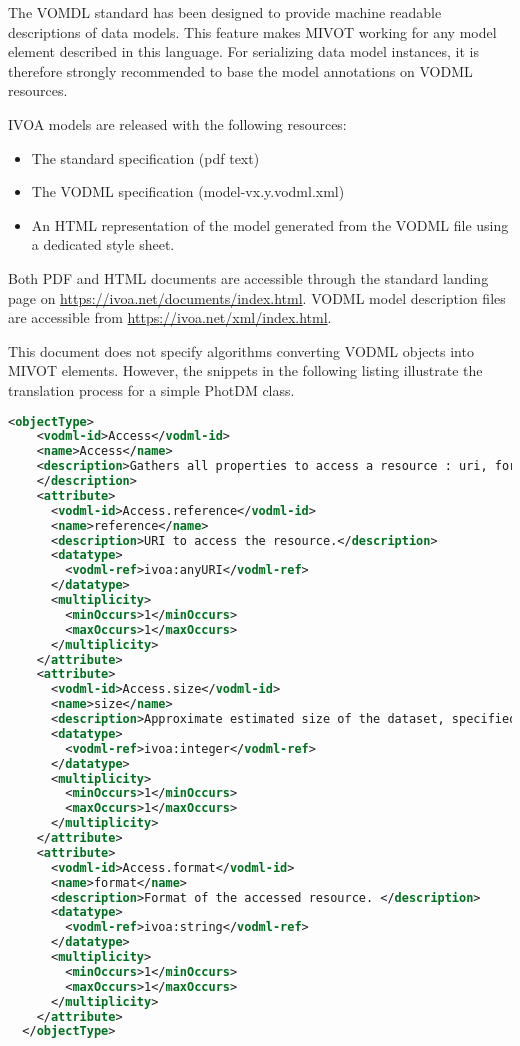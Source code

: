 The VOMDL standard has been designed to provide machine readable descriptions of data models. 
This feature makes MIVOT working for any model element described in this language. 
For serializing data model instances, it is therefore strongly recommended to base 
the model annotations on VODML resources.

IVOA models are released with the following resources:
\begin{itemize}
    \item The standard specification (pdf text)
    \item The VODML specification (model-vx.y.vodml.xml)
    \item An HTML representation of the model generated from the VODML file using a dedicated style sheet.    
\end{itemize}

Both PDF and HTML documents are accessible through the standard landing page
on \url{https://ivoa.net/documents/index.html}.
VODML model description files are accessible from \url{https://ivoa.net/xml/index.html}.

This document does not specify algorithms converting VODML objects 
into MIVOT elements. However, the snippets in the following listing illustrate the translation process for a simple PhotDM class.

\begin{lstlisting}[caption={VODML representation of the PhotDM class \texttt{Access}.
This is an object type with 3 attributes, each one with a cardinality equal  to 1. 
At this stage, we do not know whether attributes are typed complex or primitive type. 
This will be completed later on by going through their own VODML definitions.},language=XML]
  <objectType>
    <vodml-id>Access</vodml-id>
    <name>Access</name>
    <description>Gathers all properties to access a resource : uri, format and size . 
    </description>
    <attribute>
      <vodml-id>Access.reference</vodml-id>
      <name>reference</name>
      <description>URI to access the resource.</description>
      <datatype>
        <vodml-ref>ivoa:anyURI</vodml-ref>
      </datatype>
      <multiplicity>
        <minOccurs>1</minOccurs>
        <maxOccurs>1</maxOccurs>
      </multiplicity>
    </attribute>
    <attribute>
      <vodml-id>Access.size</vodml-id>
      <name>size</name>
      <description>Approximate estimated size of the dataset, specified in kilobytes.</description>
      <datatype>
        <vodml-ref>ivoa:integer</vodml-ref>
      </datatype>
      <multiplicity>
        <minOccurs>1</minOccurs>
        <maxOccurs>1</maxOccurs>
      </multiplicity>
    </attribute>
    <attribute>
      <vodml-id>Access.format</vodml-id>
      <name>format</name>
      <description>Format of the accessed resource. </description>
      <datatype>
        <vodml-ref>ivoa:string</vodml-ref>
      </datatype>
      <multiplicity>
        <minOccurs>1</minOccurs>
        <maxOccurs>1</maxOccurs>
      </multiplicity>
    </attribute>
  </objectType>
\end{lstlisting}  


